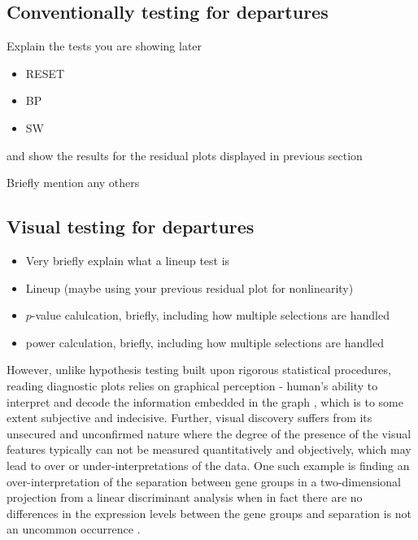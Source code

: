 \documentclass[]{interact}
\theoremstyle{plain}%
\theoremstyle{definition}
\theoremstyle{remark}
\def\tightlist{}
\begin{document}
\hypertarget{conventionally-testing-for-departures}{%
\subsection{Conventionally testing for
departures}\label{conventionally-testing-for-departures}}

Explain the tests you are showing later

\begin{itemize}
\tightlist
\item
  RESET
\item
  BP
\item
  SW
\end{itemize}

and show the results for the residual plots displayed in previous
section

Briefly mention any others

\hypertarget{visual-testing-for-departures}{%
\subsection{Visual testing for
departures}\label{visual-testing-for-departures}}

\begin{itemize}
\tightlist
\item
  Very briefly explain what a lineup test is
\item
  Lineup (maybe using your previous residual plot for nonlinearity)
\item
  \(p\)-value calulcation, briefly, including how multiple selections
  are handled
\item
  power calculation, briefly, including how multiple selections are
  handled
\end{itemize}

However, unlike hypothesis testing built upon rigorous statistical
procedures, reading diagnostic plots relies on graphical perception -
human's ability to interpret and decode the information embedded in the
graph \citep{cleveland_graphical_1984}, which is to some extent
subjective and indecisive. Further, visual discovery suffers from its
unsecured and unconfirmed nature where the degree of the presence of the
visual features typically can not be measured quantitatively and
objectively, which may lead to over or under-interpretations of the
data. One such example is finding an over-interpretation of the
separation between gene groups in a two-dimensional projection from a
linear discriminant analysis when in fact there are no differences in
the expression levels between the gene groups and separation is not an
uncommon occurrence \citep{roy_chowdhury_using_2015}.
\end{document}
